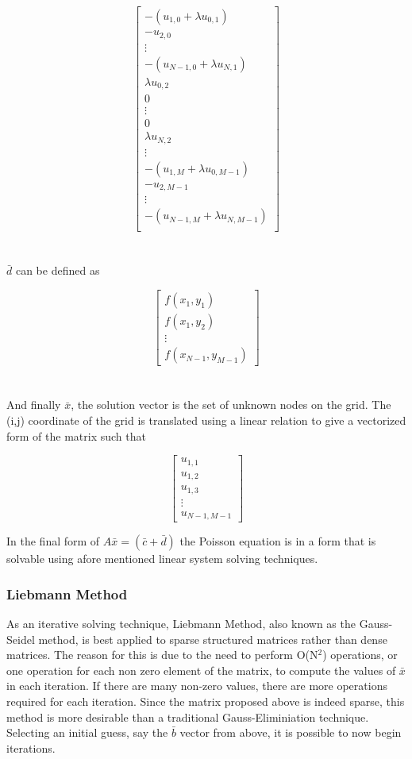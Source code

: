 \documentclass[]{aiaa-tc}%
\begin{document}
$$
\begin{bmatrix}
  -( u_{1,0} + \lambda u_{0,1}) \\
  -u_{2,0} \\
    \vdots \\
  -( u_{N-1,0} + \lambda u_{N,1}) \\
  \lambda u_{0,2} \\
    0 \\
  \vdots \\
    0 \\
  \lambda u_{N,2} \\
  \vdots \\
  -( u_{1,M} + \lambda u_{0,M-1}) \\
  -u_{2,M-1} \\
    \vdots \\
  -( u_{N-1,M} + \lambda u_{N,M-1}) \\
\end{bmatrix}
$$
\\\\
$\bar d$ can be defined as

$$
\begin{bmatrix}
  f(x_1,y_1) \\
  f(x_1,y_2) \\
  \vdots \\
  f(x_{N-1},y_{M-1})
\end{bmatrix}
$$
\\\\
And finally $\bar x$, the solution vector is the set of unknown nodes on the grid.
The (i,j) coordinate of the grid is translated using a linear relation to give
a vectorized form of the matrix such that

$$
\begin{bmatrix}
  u_{1,1} \\
  u_{1,2} \\
  u_{1,3} \\
  \vdots \\
  u_{N-1,M-1}
\end{bmatrix}
$$

In the final form of $A \bar x = (\bar c + \bar d)$ the Poisson equation is in a
form that is solvable using afore mentioned linear system solving techniques.

\subsubsection{Liebmann Method}
As an iterative solving technique, Liebmann Method, also known as the Gauss-Seidel method,
is best applied to sparse structured matrices rather than dense matrices. The reason
for this is due to the need to perform O(N$^{2}$) operations, or one operation for
each non zero element of the matrix, to compute the values of $\bar x$ in each iteration.
If there are many non-zero values, there are more operations required for each iteration.
Since the matrix proposed above is indeed sparse, this method is more desirable than a
traditional Gauss-Eliminiation technique. Selecting an initial guess, say the $\bar b$
vector from above, it is possible to now begin iterations.
\end{document}
